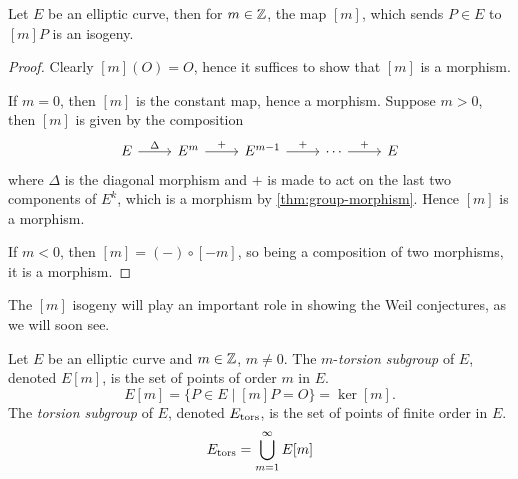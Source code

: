 
\begin{corollary}
	Let $E$ be an elliptic curve, then for $m \in \mathbb{Z}$, the map $[m]$, which
	sends $P \in E$ to $[m]P$ is an isogeny.
\end{corollary}

\begin{proof}
	Clearly $[m](O) = O$, hence it suffices to show that $[m]$ is a morphism.

	If $m = 0$, then $[m]$ is the constant map, hence a morphism.
	Suppose $m > 0$, then $[m]$ is given by the composition
	\begin{equation*}
		\begin{tikzcd}
			E & {E^m} & {E^{m-1}} & \cdots & E
			\arrow["{\Delta}", from=1-1, to=1-2]
			\arrow["{+}", from=1-2, to=1-3]
			\arrow["+", from=1-3, to=1-4]
			\arrow["+", from=1-4, to=1-5]
		\end{tikzcd}
	\end{equation*}
	where $\Delta$ is the diagonal morphism and $+$ is made to act on the
	last two components of $E^k$, which is a morphism by
	\ref{thm:group-morphism}. Hence $[m]$ is a morphism.

	If $m < 0$, then $[m] = (-)\circ[-m]$, so being a composition of two
	morphisms, it is a morphism.
\end{proof}

The $[m]$ isogeny will play an important role in showing the
Weil conjectures, as we will soon see.


\begin{definition}
	Let $E$ be an elliptic curve and $m \in \mathbb{Z}$, $m \neq 0$. The
	$m$-\emph{torsion subgroup} of $E$, denoted $E[m]$, is the set of
	points of order $m$ in $E$.
	\begin{equation*}
		E[m] = \{P \in E \mid [m]P = O\} = \ker[m].
	\end{equation*}
	The \emph{torsion subgroup} of $E$, denoted $E_{\operatorname{tors}}$, is the set of
	points of finite order in $E$.
	\begin{equation*}
		E_{\operatorname{tors}} = \bigcup_{m=1}^\infty E[m]
	\end{equation*}
\end{definition}


